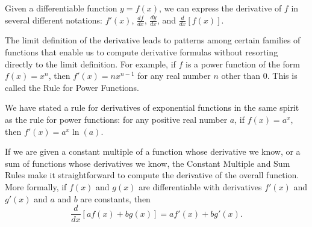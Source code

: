 \begin{summary}
\item Given a differentiable function $y = f(x)$, we can express the derivative of $f$ in several different notations:  $f'(x)$, $\frac{df}{dx}$, $\frac{dy}{dx}$, and $\frac{d}{dx}[f(x)]$.
\item The limit definition of the derivative leads to patterns among certain families of functions that enable us to compute derivative formulas without resorting directly to the limit definition.  For example, if $f$ is a power function of the form $f(x) = x^n$, then $f'(x) = nx^{n-1}$ for any real number $n$ other than 0.  This is called the Rule for Power Functions.
\item We have stated a rule for derivatives of exponential functions in the same spirit as the rule for power functions:  for any positive real number $a$, if $f(x) = a^x$, then $f'(x) = a^x \ln(a)$.
\item If we are given a constant multiple of a function whose derivative we know, or a sum of functions whose derivatives we know, the Constant Multiple and Sum Rules make it straightforward to compute the derivative of the overall function.  More formally, if $f(x)$ and $g(x)$ are differentiable with derivatives $f'(x)$ and $g'(x)$ and $a$ and $b$ are constants, then
$$\frac{d}{dx} \left[af(x) + bg(x)\right] = af'(x) + bg'(x).$$
\end{summary}

\nin \hrulefill

 

\clearpage
